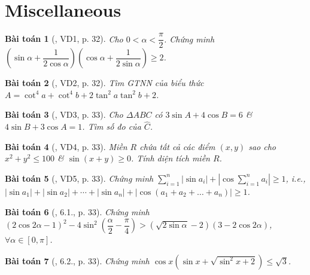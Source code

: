 \documentclass{article}
\newtheorem{baitoan}{Bài toán}
\begin{document}

\section{Miscellaneous}

\begin{baitoan}[\cite{Hung_nang_cao_phat_trien_Toan_11_tap_1}, VD1, p. 32]
	Cho $0 < \alpha < \dfrac{\pi}{2}$. Chứng minh $\left(\sin\alpha + \dfrac{1}{2\cos\alpha}\right)\left(\cos\alpha + \dfrac{1}{2\sin\alpha}\right)\ge2$.
\end{baitoan}

\begin{baitoan}[\cite{Hung_nang_cao_phat_trien_Toan_11_tap_1}, VD2, p. 32]
	Tìm {\rm GTNN} của biểu thức $A = \cot^4a + \cot^4b + 2\tan^2a\tan^2b + 2$.
\end{baitoan}

\begin{baitoan}[\cite{Hung_nang_cao_phat_trien_Toan_11_tap_1}, VD3, p. 33]
	Cho $\Delta ABC$ có $3\sin A + 4\cos B = 6$ \& $4\sin B + 3\cos A = 1$. Tìm số đo của $\widehat{C}$.
\end{baitoan}

\begin{baitoan}[\cite{Hung_nang_cao_phat_trien_Toan_11_tap_1}, VD4, p. 33]
	Miền $R$ chứa tất cả các điểm $(x,y)$ sao cho $x^2 + y^2\le100$ \& $\sin(x + y)\ge0$. Tính diện tích miền $R$.
\end{baitoan}

\begin{baitoan}[\cite{Hung_nang_cao_phat_trien_Toan_11_tap_1}, VD5, p. 33]
	Chứng minh $\sum_{i=1}^n |\sin a_i| + |\cos\sum_{i=1}^n a_i|\ge1$, i.e., $|\sin a_1| + |\sin a_2| + \cdots + |\sin a_n| + |\cos(a_1 + a_2 + \ldots + a_n)|\ge1$.
\end{baitoan}

\begin{baitoan}[\cite{Hung_nang_cao_phat_trien_Toan_11_tap_1}, 6.1., p. 33]
	Chứng minh $(2\cos2\alpha - 1)^2 - 4\sin^2\left(\dfrac{\alpha}{2} - \dfrac{\pi}{4}\right) > (\sqrt{2\sin\alpha} - 2)(3 - 2\cos2\alpha)$, $\forall\alpha\in[0,\pi]$.
\end{baitoan}

\begin{baitoan}[\cite{Hung_nang_cao_phat_trien_Toan_11_tap_1}, 6.2., p. 33]
	Chứng minh $\cos x(\sin x + \sqrt{\sin^2x + 2})\le\sqrt{3}$.
\end{baitoan}
\end{document}

